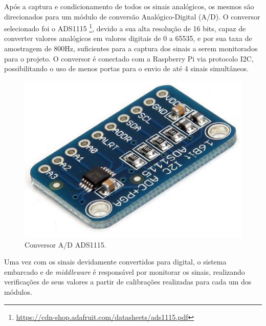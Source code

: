 Após a captura e condicionamento de todos os sinais analógicos, os mesmos são direcionados
para um módulo de conversão Analógico-Digital (A/D). O conversor selecionado foi o ADS1115 \footnote{\url{https://cdn-shop.adafruit.com/datasheets/ads1115.pdf}},
devido a sua alta resolução de 16 bits, capaz de converter valores analógicos em valores
digitais de 0 a 65535, e por sua taxa de amostragem de 800Hz, suficientes para a captura dos
sinais a serem monitorados para o projeto. O conversor é conectado com a Raspberry Pi via protocolo I2C,
possibilitando o uso de menos portas para o envio de até 4 sinais simultâneos.


\begin{figure}[h!]
    \begin{center}
        \includegraphics[scale=0.5]{figuras/ads.jpg}
    \end{center}
    \caption{Conversor A/D ADS1115.}
    \label{fig:ads}
\end{figure}

Uma vez com os sinais devidamente convertidos para digital, o sistema embarcado e de \textit{middleware}
é responsável por monitorar os sinais, realizando verificações de seus valores a partir de calibrações
realizadas para cada um dos módulos.
